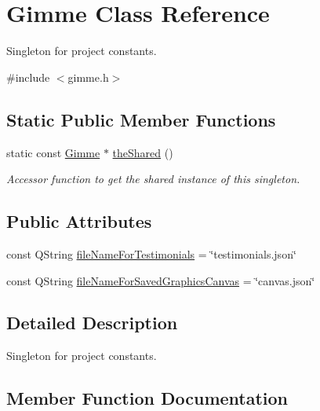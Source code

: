 \hypertarget{class_gimme}{}\section{Gimme Class Reference}
\label{class_gimme}


Singleton for project constants.  




{\ttfamily \#include $<$gimme.\+h$>$}

\subsection*{Static Public Member Functions}
\begin{DoxyCompactItemize}
\item 
static const \mbox{\hyperlink{class_gimme}{Gimme}} $\ast$ \mbox{\hyperlink{class_gimme_a919dd9390c493f42f847039d024f9f80}{the\+Shared}} ()
\begin{DoxyCompactList}\small\item\em Accessor function to get the shared instance of this singleton. \end{DoxyCompactList}\end{DoxyCompactItemize}
\subsection*{Public Attributes}
\begin{DoxyCompactItemize}
\item 
const Q\+String \mbox{\hyperlink{class_gimme_aa9fd95a9aa3dc9734d4f8357c4620efa}{file\+Name\+For\+Testimonials}} = \char`\"{}testimonials.\+json\char`\"{}
\item 
const Q\+String \mbox{\hyperlink{class_gimme_a75f442cedd5b873cc9982a812ac56c8f}{file\+Name\+For\+Saved\+Graphics\+Canvas}} = \char`\"{}canvas.\+json\char`\"{}
\end{DoxyCompactItemize}


\subsection{Detailed Description}
Singleton for project constants. 



\subsection{Member Function Documentation}
\mbox{\label{class_gimme_a919dd9390c493f42f847039d024f9f80}} 

